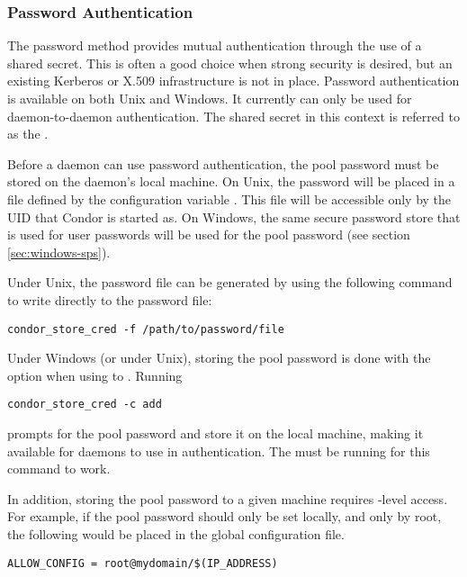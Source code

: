 \subsubsection{\label{sec:Password-Authentication} Password Authentication}

The password method provides mutual authentication through the use of
a shared secret.  This is often a good choice when strong security is
desired,
but an existing Kerberos or X.509 infrastructure is not in place.
Password authentication is available on both Unix and Windows.
It currently can only be used for daemon-to-daemon authentication.
The shared secret in this context is referred to as
the .

Before a daemon can use password authentication, the pool password
must be stored on the daemon's local machine.
On Unix, the password
will be placed in a file defined by the configuration variable
. This file will be accessible only by the
UID that Condor is started as.  On Windows, the same secure password
store that is used for user passwords will be used for the pool
password (see section \ref{sec:windows-sps}).

Under Unix, the password file can be generated by using the following
command to write directly to the password file:
\begin{verbatim}
condor_store_cred -f /path/to/password/file
\end{verbatim}

Under Windows (or under Unix), storing the pool password is done
with the  option when using to  .
Running
\begin{verbatim}
condor_store_cred -c add
\end{verbatim}
prompts for the pool password and store it on the local machine,
making it available for daemons to use in authentication. The
 must be running for this command to work.

In addition, storing the pool password to a given machine requires
\verb@CONFIG@-level access. For example, if the pool password should
only be set locally, and only by root, the following would be placed in
the global configuration file.
\begin{verbatim}
ALLOW_CONFIG = root@mydomain/$(IP_ADDRESS)
\end{verbatim}

